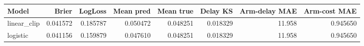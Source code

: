 \begin{tabular}{lrrrrrrr}
\toprule
Model & Brier & LogLoss & Mean pred & Mean true & Delay KS & Arm-delay MAE & Arm-cost MAE \\
\midrule
linear\_clip & 0.041572 & 0.185787 & 0.050472 & 0.048251 & 0.018329 & 11.958 & 0.945650 \\
logistic & 0.041156 & 0.159879 & 0.047610 & 0.048251 & 0.018329 & 11.958 & 0.945650 \\
\bottomrule
\end{tabular}
